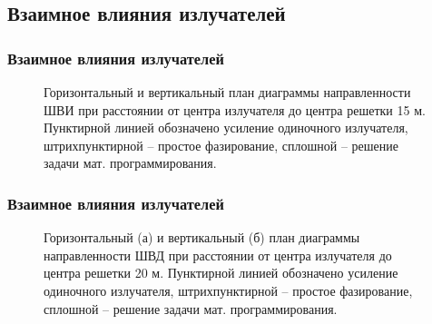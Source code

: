 \subsection{Взаимное влияния излучателей}
\begin{frame}
    \frametitle{Взаимное влияния излучателей}
    \begin{figure}
    \begin{minipage}[h]{0.49\linewidth}
    \end{minipage}
    \hfill
    \begin{minipage}[h]{0.49\linewidth}
    \end{minipage}
    \caption{Горизонтальный и вертикальный план диаграммы направленности ШВИ при расстоянии от центра излучателя до центра решетки 15 м. Пунктирной линией обозначено усиление одиночного излучателя, штрихпунктирной – простое фазирование, сплошной – решение задачи мат. программирования.}
    \label{pic:r_bve_15_results}
    \end{figure}
\end{frame}

\begin{frame}
    \frametitle{Взаимное влияния излучателей}
    \begin{figure}
    \begin{minipage}[h]{0.49\linewidth}
    \end{minipage}
    \hfill
    \begin{minipage}[h]{0.49\linewidth}
    \end{minipage}
    \caption{Горизонтальный (а) и вертикальный (б) план диаграммы направленности ШВД при расстоянии от центра излучателя до центра решетки 20 м. Пунктирной линией обозначено усиление одиночного излучателя, штрихпунктирной – простое фазирование, сплошной – решение задачи мат. программирования.}
    \label{pic:r_bvd_result_2}
    \end{figure}

\end{frame}

